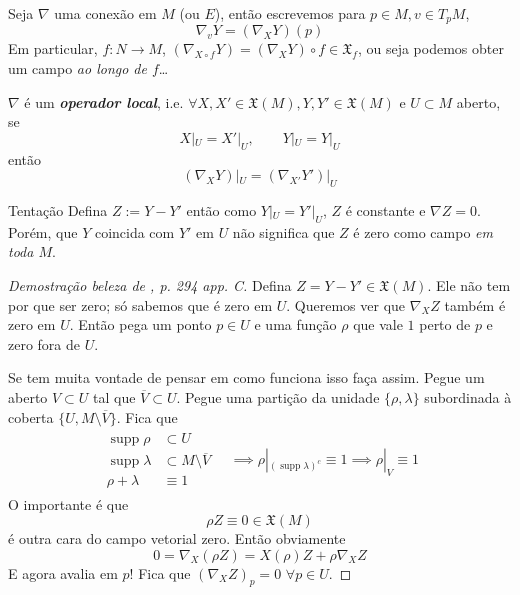 Seja \(\nabla\) uma conexão em \(M\) (ou \(E\)), então escrevemos para \(p \in M, v \in T_pM\),
\[\nabla_v Y = (\nabla_X Y)(p)\]
Em particular, \(f :N \to M\), \((\nabla_{X \circ f}Y)=(\nabla_XY)\circ f\in \mathfrak{X}_f\), ou seja podemos obter um campo \textit{ao longo de \(f\)}…  
\begin{prop}\leavevmode
\(\nabla\) é um \textit{\textbf{operador local}}, i.e. \(\forall  X,X' \in \mathfrak{X}(M), Y,Y' \in \mathfrak{X}(M)\) e \(U \subset M\) aberto, se
\[X|_{ U}=X'|_{U},\qquad Y|_{U}=Y|_{U}\]
então
\[(\nabla_XY)|_{U}=(\nabla_{X'}Y')|_{U}\]
\end{prop}
\begin{thing7}{Tentação}\leavevmode
Defina \(Z:=Y-Y'\)  então como \(Y|_{ U}=Y'|_{U}\), \(Z\) é constante e \(\nabla Z=0\). Porém, que \(Y\) coincida com \(Y'\) em \(U\) não significa que \(Z\) é zero como campo \textit{em toda \(M\)}. 
\end{thing7}
\begin{proof}[Demostração beleza de \cite{milnorch}, p. 294 app. C]\leavevmode
Defina \(Z=Y-Y' \in \mathfrak{X}(M)\). Ele não tem por que ser zero; só sabemos que é zero em \(U\). Queremos ver que \(\nabla_XZ\) também é zero em \(U\). Então pega um ponto \(p \in U\) e uma função \(\rho\) que vale \(1\) perto de \(p\) e zero fora de \(U\).

{\color{7}Se tem muita vontade de pensar em como funciona isso faça assim. Pegue um aberto \(V \subset U\) tal que \(\overline{V}\subset U\). Pegue uma partição da unidade \(\{\rho,\lambda\}\) subordinada à coberta \(\{U,M\setminus \overline{V}\}\). Fica que
\begin{align*}
\begin{aligned}
\operatorname{supp}\rho &  \subset U\\
\operatorname{supp}\lambda &  \subset M\setminus \overline{V}\\
\rho+\lambda & \equiv 1
\end{aligned}
\quad \implies \rho |_{(\operatorname{supp}\lambda)^c}\equiv 1 \implies \rho |_{V}\equiv 1
\end{align*}}
O importante é que
\[\rho Z \equiv 0 \in \mathfrak{X}(M)\]
é outra cara do campo vetorial zero. Então obviamente
\[0=\nabla_X(\rho Z)=X(\rho)Z+\rho \nabla_XZ\]
E agora avalia em \(p\)! Fica que \((\nabla_XZ)_p=0\) \(\forall  p \in U\).
\end{proof}
